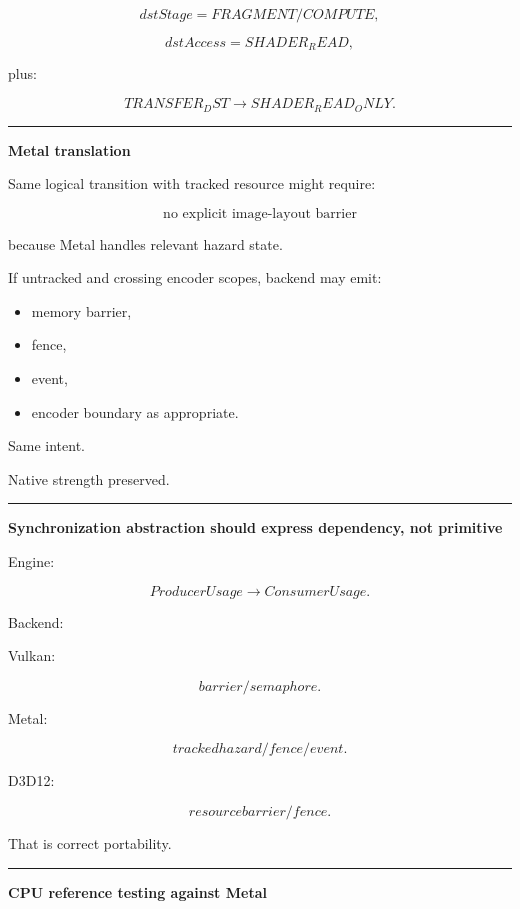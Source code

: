 \[
dstStage=FRAGMENT/COMPUTE,
\]

\[
dstAccess=SHADER_READ,
\]

plus:

\[
TRANSFER_DST
\rightarrow
SHADER_READ_ONLY.
\]

\begin{center}\rule{0.5\linewidth}{0.5pt}\end{center}

\textbf{Metal translation}

Same logical transition with tracked resource might require:

\[
\boxed{\text{no explicit image-layout barrier}}
\]

because Metal handles relevant hazard state.

If untracked and crossing encoder scopes, backend may emit:

\begin{itemize}
\tightlist
\item
  memory barrier,
\item
  fence,
\item
  event,
\item
  encoder boundary as appropriate.
\end{itemize}

Same intent.

Native strength preserved.

\begin{center}\rule{0.5\linewidth}{0.5pt}\end{center}

\textbf{Synchronization abstraction should express dependency, not primitive}

Engine:

\[
ProducerUsage
\rightarrow
ConsumerUsage.
\]

Backend:

Vulkan:

\[
barrier/semaphore.
\]

Metal:

\[
tracked hazard/fence/event.
\]

D3D12:

\[
resource barrier/fence.
\]

That is correct portability.

\begin{center}\rule{0.5\linewidth}{0.5pt}\end{center}

\textbf{CPU reference testing against Metal}

